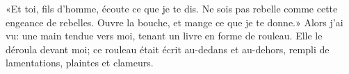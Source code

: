 «Et toi, fils d’homme, écoute ce que je te dis.
	Ne sois pas rebelle comme cette engeance de rebelles.
	Ouvre la bouche, et mange ce que je te donne.»
Alors j’ai vu: une main tendue vers moi, tenant un livre en forme de rouleau.
Elle le déroula devant moi; ce rouleau était écrit au-dedans et au-dehors,
	rempli de lamentations, plaintes et clameurs.
